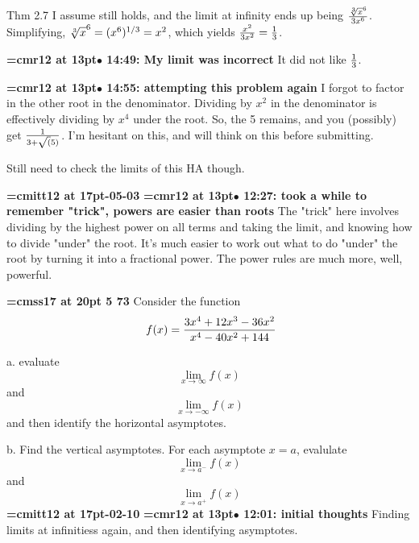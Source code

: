 Thm 2.7 I assume still holds, and the limit at infinity ends up being ${\root 3 \of x^6 \over 3x^6}$. Simplifying, ${\root 3 \of x^6} = (x^6)^{1/3}=x^2$, which yields ${x^2 \over 3x^2} = {1 \over 3}$.
\par

{\smallskip\noindent\bf\font\titlefont=cmr12 at 13pt\titlefont $\bullet$ 14:49: My limit was incorrect}\smallskip
It did not like ${1 \over 3}$.
\par

{\smallskip\noindent\bf\font\titlefont=cmr12 at 13pt\titlefont $\bullet$ 14:55: attempting this problem again}\smallskip
I forgot to factor in the other root in the denominator. Dividing by $x^2$ in the denominator is effectively dividing by $x^4$ under the root. So, the 5 remains, and you (possibly) get $1 \over {3 + \sqrt(5)}$. I'm hesitant on this, and will think on this before submitting.
\par

Still need to check the limits of this HA though.
\par

{\medskip\noindent\bf\font\titlefont=cmitt12 at 17pt-05-03}\medskip
{\smallskip\noindent\bf\font\titlefont=cmr12 at 13pt\titlefont $\bullet$ 12:27: took a while to remember "trick", powers are easier than roots}\smallskip
The "trick" here involves dividing by the highest power on all terms and taking the limit, and knowing how to divide "under" the root. It's much easier to work out what to do "under" the root by turning it into a fractional power. The power rules are much more, well, powerful.
\par

{\medskip\noindent\bf\font\titlefont=cmss17 at 20pt 5 73}\medskip
Consider the function
$$\
f(x) = {
3x^4 + 12x^3 - 36x^2
\over
x^4 - 40x^2 + 144
}
$$
\par a. evaluate $$\lim_{x \to \infty}{f(x)}$$ and
$$\lim_{x \to -\infty}{f(x)}$$ and then identify the horizontal
asymptotes.
\par b. Find the vertical asymptotes. For each asymptote $x = a$,
evalulate $$\lim_{x \to a^{-}}{f(x)}$$ and $$\lim_{x \to a^{+}}{f(x)}$$
{\medskip\noindent\bf\font\titlefont=cmitt12 at 17pt\titlefont 2026-02-10}\medskip
{\smallskip\noindent\bf\font\titlefont=cmr12 at 13pt\titlefont $\bullet$ 12:01: initial thoughts}\smallskip
Finding limits at infinitiess again, and then identifying asymptotes.
\par

